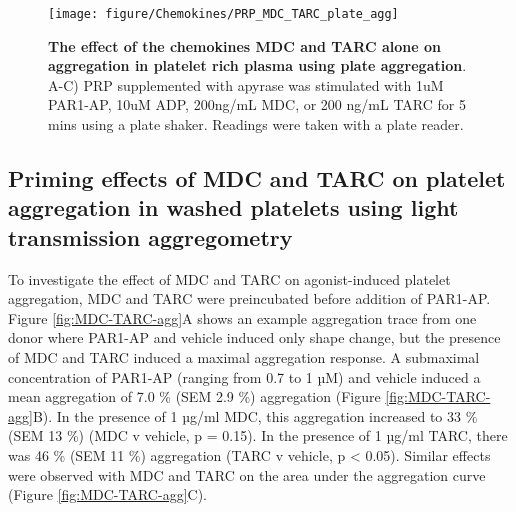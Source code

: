 \documentclass[11pt,twoside]{bristolthesis}
\begin{document}
\begin{figure}

{\centering \texttt{[image: figure/Chemokines/PRP\_MDC\_TARC\_plate\_agg]} 

}

\caption[The effect of the chemokines MDC and TARC alone on aggregation in platelet rich plasma using plate aggregation]{\textbf{The effect of the chemokines MDC and TARC alone on aggregation in platelet rich plasma using plate aggregation}. A-C) PRP supplemented with apyrase was stimulated with 1uM PAR1-AP, 10uM ADP, 200ng/mL MDC, or 200 ng/mL TARC for 5 mins using a plate shaker. Readings were taken with a plate reader.}\label{fig:plate-agg-chemokines}
\end{figure}
\hypertarget{priming-effects-of-mdc-and-tarc-on-platelet-aggregation-in-washed-platelets-using-light-transmission-aggregometry}{%
\subsection{Priming effects of MDC and TARC on platelet aggregation in washed platelets using light transmission aggregometry}\label{priming-effects-of-mdc-and-tarc-on-platelet-aggregation-in-washed-platelets-using-light-transmission-aggregometry}}

To investigate the effect of MDC and TARC on agonist-induced platelet aggregation, MDC and TARC were preincubated before addition of PAR1-AP. Figure \ref{fig:MDC-TARC-agg}A shows an example aggregation trace from one donor where PAR1-AP and vehicle induced only shape change, but the presence of MDC and TARC induced a maximal aggregation response. A submaximal concentration of PAR1-AP (ranging from 0.7 to 1 µM) and vehicle induced a mean aggregation of 7.0 \% (SEM 2.9 \%) aggregation (Figure \ref{fig:MDC-TARC-agg}B). In the presence of 1 µg/ml MDC, this aggregation increased to 33 \% (SEM 13 \%) (MDC v vehicle, p = 0.15). In the presence of 1 µg/ml TARC, there was 46 \% (SEM 11 \%) aggregation (TARC v vehicle, p \textless{} 0.05). Similar effects were observed with MDC and TARC on the area under the aggregation curve (Figure \ref{fig:MDC-TARC-agg}C).
\end{document}
